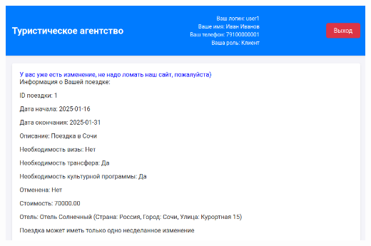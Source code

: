 \documentclass[a4paper,12pt]{article}
\begin{document}
\begin{enumerate}
          \includegraphics[scale=0.5]{media/client/break.png} \\
\end{enumerate}
\end{document}
